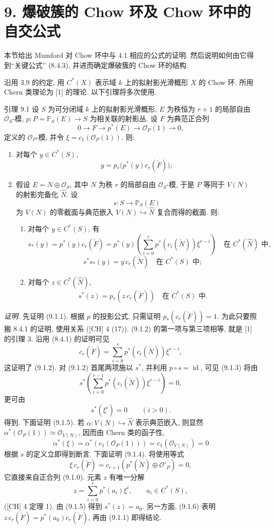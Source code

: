 \section*{9. 爆破簇的 Chow 环及 Chow 环中的自交公式}

本节给出 Mumford 对 Chow 环中与 4.1 相应的公式的证明. 然后说明如何由它得到“关键公式” (8.4.3), 并进而确定爆破簇的 Chow 环的结构.

沿用 3.9 的约定, 用 $C^*(X)$ 表示域 $k$ 上的拟射影光滑概形 $X$ 的 Chow 环. 所用 Chern 类理论为 [1] 的理论. 以下引理将多次使用.

\begin{statement}{引理 9.1}
设 $S$ 为可分闭域 $k$ 上的拟射影光滑概形, $E$ 为秩恒为 $r+1$ 的局部自由 $\mathcal O_S$-模, $p:P=\mathbb P_S(E)\to S$ 为相关联的射影丛. 设 $F$ 为典范正合列
\[
0\to F\to p^*(E)\to\mathcal O_P(1)\to0,
\tag{9.1.0}
\]
定义的 $\mathcal O_P$-模, 并令 $\xi=c_1(\mathcal O_P(1))$. 则:
\begin{enumerate}[label=(\roman*)]
\item 对每个 $y\in C^*(S)$,
\[
y=p_*\bigl(p^*(y)c_r(\check F)\bigr);
\tag{9.1.1}
\]
\item 假设 $E=N\oplus\mathcal O_S$, 其中 $N$ 为秩 $r$ 的局部自由 $\mathcal O_S$-模, 于是 $P$ 等同于 $V(N)$ 的射影完备化 $\widehat N$. 设
\[
s:S\to\mathbb P_S(E)
\]
为 $V(N)$ 的零截面与典范嵌入 $V(N)\hookrightarrow\widehat N$ 复合而得的截面. 则:
\begin{enumerate}[label=(\alph*)]
\item 对每个 $y\in C^*(S)$, 有
\[
s_*(y)=p^*(y)c_r(\check F)=p^*(y)\left(\sum_{i=0}^r p^*(c_i(\check N))\xi^{r-i}\right)
\quad\text{在 }C^*(\widehat N)\text{ 中},
\tag{9.1.2}
\]
\[
s^*s_*(y)=y\,c_r(\check N)\quad\text{在 }C^*(S)\text{ 中};
\tag{9.1.3}
\]
\item 对每个 $z\in C^*(\widehat N)$,
\[
s^*(z)=p_*(z\,c_r(\check F))\quad\text{在 }C^*(S)\text{ 中}.
\tag{9.1.4}
\]
\end{enumerate}
\end{enumerate}
\end{statement}

\emph{证明.} 先证明 (9.1.1). 根据 $p$ 的投影公式, 只需证明 $p_*(c_r(\check F))=1$. 为此只要照搬 8.4.1 的证明, 使用关系 ([CH] 4 (17)). (9.1.2) 的第一项与第三项相等, 就是 [1] 的引理 3. 沿用 (8.4.1) 的证明可见
\[
c_r(\check F)=\sum_{i=0}^r p^*(c_i(\check N))\xi^{r-i},
\tag{9.1.2 bis}
\]
这证明了 (9.1.2). 对 (9.1.2) 首尾两项施以 $s^*$, 并利用 $p\circ s=\operatorname{id}$, 可见 (9.1.3) 将由
\[
s^*\left(\sum_{i=0}^{r-1}p^*(c_i(\check N))\xi^{r-i}\right)=0,
\]
更可由
\[
s^*(\xi^i)=0\qquad(i>0).
\tag{9.1.5}
\]
得到. 下面证明 (9.1.5). 若 $\alpha:V(N)\hookrightarrow\widehat N$ 表示典范嵌入, 则显然 $\alpha^*(\mathcal O_P(1))\simeq\mathcal O_{V(N)}$, 因而由 Chern 类的函子性,
\[
\alpha^*(\xi)=\alpha^*(c_1(\mathcal O_P(1)))=c_1(\mathcal O_{V(N)})=0
\]
根据 $s$ 的定义立即得到断言. 下面证明 (9.1.4). 将使用等式
\[
\xi\,c_r(\check F)=c_{r+1}(p^*(\check N)\oplus\mathcal O'_P)=0,
\tag{9.1.6}
\]
它直接来自正合列 (9.1.0). 元素 $z$ 有唯一分解
\[
z=\sum_{i=0}^r p^*(a_i)\xi^i,\qquad a_i\in C^*(S),
\]
([CH] 4 定理 1). 由 (9.1.5) 得到 $s^*(z)=a_0$. 另一方面, (9.1.6) 表明 $z\,c_r(\check F)=p^*(a_0)c_r(\check F)$, 再由 (9.1.1) 即得结论.

